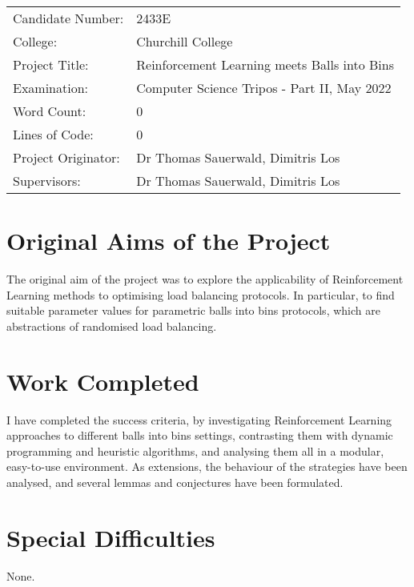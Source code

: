 
\begin{proforma}      


\begin{table}[h]
\begin{tabular}{ll}
Candidate Number:  & 2433E \\
College: & Churchill College \\
Project Title:    &  Reinforcement Learning meets Balls into Bins  \\
Examination:  & Computer Science Tripos - Part II, May 2022   \\
Word Count:  & 0  \\
Lines of Code: & 0 \\
Project Originator: & Dr Thomas Sauerwald, Dimitris Los \\
Supervisors: & Dr Thomas Sauerwald, Dimitris Los 
\end{tabular}
\end{table}

\section*{Original Aims of the Project}

The original aim of the project was to explore the applicability of Reinforcement Learning methods to optimising load balancing protocols. In particular, to find suitable parameter values for parametric balls into bins protocols, which are abstractions of randomised load balancing.

\section*{Work Completed}

I have completed the success criteria, by investigating Reinforcement Learning approaches to different balls into bins settings, contrasting them with dynamic programming and heuristic algorithms, and analysing them all in a modular, easy-to-use environment. As extensions, the behaviour of the strategies have been analysed, and several lemmas and conjectures have been formulated.

\section*{Special Difficulties}

None.

\end{proforma}
